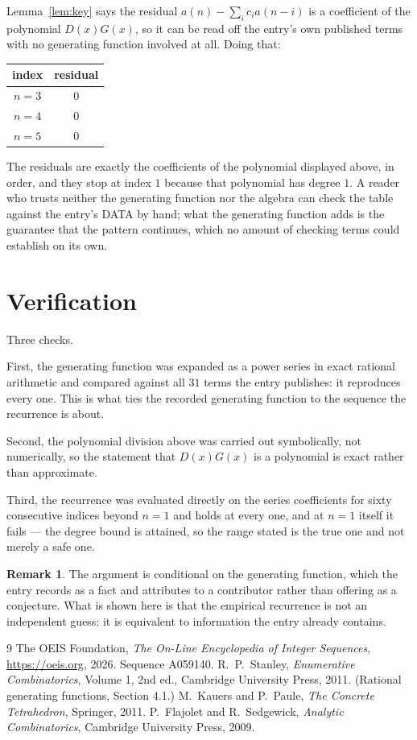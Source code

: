 \documentclass[11pt,a4paper]{article}
\theoremstyle{plain}
\theoremstyle{definition}
\newtheorem{remark}[theorem]{Remark}
\begin{document}
Lemma~\ref{lem:key} says the residual $a(n)-\sum_ic_ia(n-i)$ is a coefficient of the
polynomial $D(x)G(x)$, so it can be read off the entry's own published terms with no
generating function involved at all. Doing that:
\begin{center}
\begin{tabular}{cc}
index & residual \\ \hline
$n=3$ & $0$ \\
$n=4$ & $0$ \\
$n=5$ & $0$
\end{tabular}
\end{center}
The residuals are exactly the coefficients of the polynomial displayed above, in order, and
they stop at index $1$ because that polynomial has degree $1$. A reader who trusts
neither the generating function nor the algebra can check the table against the entry's DATA
by hand; what the generating function adds is the guarantee that the pattern continues, which
no amount of checking terms could establish on its own.

\section{Verification}

Three checks.

First, the generating function was expanded as a power series in exact rational arithmetic and
compared against all $31$ terms the entry publishes: it reproduces every one. This is
what ties the recorded generating function to the sequence the recurrence is about.

Second, the polynomial division above was carried out symbolically, not numerically, so the
statement that $D(x)G(x)$ is a polynomial is exact rather than approximate.

Third, the recurrence was evaluated directly on the series coefficients for sixty consecutive
indices beyond $n=1$ and holds at every one, and at $n=1$ itself it fails --- the
degree bound is attained, so the range stated is the true one and not merely a safe one.

\begin{remark}
The argument is conditional on the generating function, which the entry records as a fact and
attributes to a contributor rather than offering as a conjecture. What is shown here is that
the empirical recurrence is not an independent guess: it is equivalent to information the
entry already contains.
\end{remark}

\begin{thebibliography}{9}
 The OEIS Foundation, \emph{The On-Line Encyclopedia of Integer
Sequences}, \url{https://oeis.org}, 2026. Sequence A059140.
 R.~P.~Stanley, \emph{Enumerative Combinatorics}, Volume 1, 2nd ed.,
Cambridge University Press, 2011. (Rational generating functions, Section 4.1.)
 M.~Kauers and P.~Paule, \emph{The Concrete Tetrahedron}, Springer, 2011.
 P.~Flajolet and R.~Sedgewick, \emph{Analytic Combinatorics}, Cambridge
University Press, 2009.
\end{thebibliography}
\end{document}
